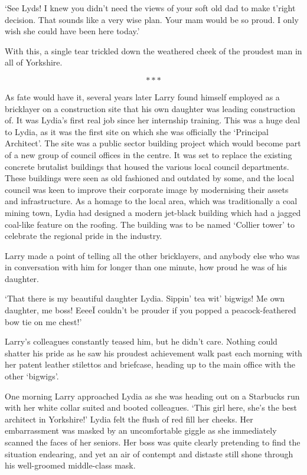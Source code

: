 `See Lyds! I knew you didn't need the views of your soft old dad to
make t'right decision. That sounds like a very wise plan. Your mam
would be so proud. I only wish she could have been here today.'

With this, a single tear trickled down the weathered cheek of the
proudest man in all of Yorkshire.

\[***\]

As fate would have it, several years later Larry found himself
employed as a bricklayer on a construction site that his own daughter
was leading construction of. It was Lydia's first real job since her
internship training.  This was a huge deal to Lydia, as it was the
first site on which she was officially the `Principal Architect'. The
site was a public sector building project which would become part of a
new group of council offices in the centre. It was set to replace the
existing concrete brutalist buildings that housed the various local
council departments.
These buildings were seen as old fashioned and
outdated by some, and the local council was %
keen to improve their %
corporate image by modernising their assets and infrastructure.
As a homage to the local area, which was
traditionally a coal mining town, Lydia had designed a modern jet-black
building which had a jagged coal-like feature on the roofing. The building
was to be named `Collier tower' to celebrate the regional pride in the industry.

Larry made a point of telling all the other bricklayers, and anybody
else who was in conversation with him for longer than one minute,
how proud he was of his daughter. %

`That there is my beautiful daughter Lydia. Sippin' tea wit' bigwigs!
Me own daughter, me boss! Eeee\=I couldn't be prouder if you popped a
peacock-feathered bow tie on me chest!'

Larry's colleagues constantly teased him, but he didn't care. Nothing
could shatter his pride as he saw his proudest achievement walk past
each morning with her patent leather stilettos and briefcase, heading
up to the main office with the other `bigwigs'.

One morning Larry approached Lydia as she was heading out on a
Starbucks run with her white collar suited and booted
colleagues. `This girl here, she's the best architect in Yorkshire!'
Lydia felt the flush of red fill her cheeks. Her embarrassment was
masked by an uncomfortable giggle as she immediately scanned the faces
of her seniors. Her boss was quite clearly pretending to find the
situation endearing, and yet an air of contempt and distaste still
shone through his well-groomed middle-class mask.

